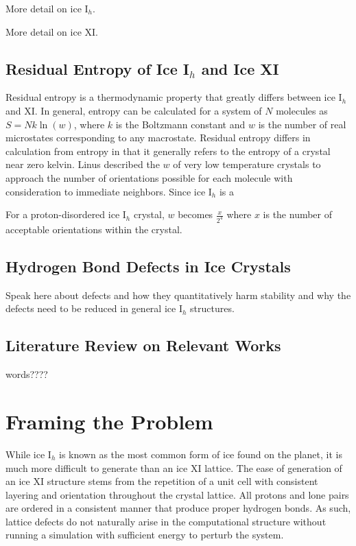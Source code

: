 More detail on ice I$_{h}$.

More detail on ice XI.

\subsection{Residual Entropy of Ice I$_{h}$ and Ice XI}

Residual entropy is a thermodynamic property that greatly differs between ice I$_{h}$ and XI. 
In general, entropy can be calculated for a system of $N$ molecules as $S = Nk\ln(w)$, where $k$ is the Boltzmann constant and $w$ is the number of real microstates corresponding to any macrostate.
Residual entropy differs in calculation from entropy in that it generally refers to the entropy of a crystal near zero kelvin. 
Linus \cite{PaulingIce} described the $w$ of very low temperature crystals to approach the number of orientations possible for each molecule with consideration to immediate neighbors. 
Since ice I$_{h}$ is a 

For a proton-disordered ice I$_{h}$ crystal, $w$ becomes $\frac{x}{2^{4}}$ where $x$ is the number of acceptable orientations within the crystal.

\subsection{Hydrogen Bond Defects in Ice Crystals}

Speak here about defects and how they quantitatively harm stability and why the defects need to be reduced in general ice I$_{h}$ structures.

\subsection{Literature Review on Relevant Works}

words????


\section{Framing the Problem}
While ice I$_{h}$ is known as the most common form of ice found on the planet, it is much more difficult to generate than an ice XI lattice. 
The ease of generation of an ice XI structure stems from the repetition of a unit cell with consistent layering and orientation throughout the crystal lattice. 
All protons and lone pairs are ordered in a consistent manner that produce proper hydrogen bonds. 
As such, lattice defects do not naturally arise in the computational structure without running a simulation with sufficient energy to perturb the system.

